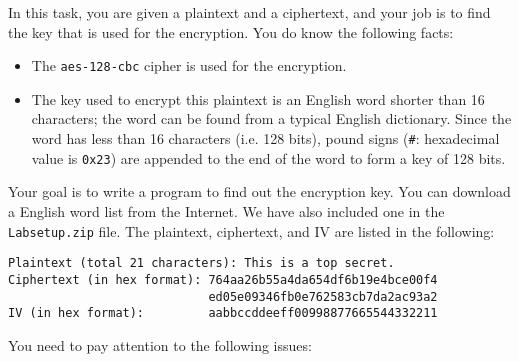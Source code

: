 In this task, you are given a plaintext and a ciphertext, and
your job is to find the key that is used for the encryption.
You do know the following facts:

\begin{itemize}
\item The {\tt aes-128-cbc} cipher is used for the encryption.
\item The key used to encrypt this plaintext is an English
word shorter than 16 characters; the word can be found from a typical
English dictionary.  Since the word has less than 16 characters (i.e. 128
bits), pound signs (\texttt{\#}: hexadecimal value is \texttt{0x23})
are appended to the end of the word to form a key of 128 bits.
\end{itemize}


Your goal is to write a program to
find out the encryption key. You can download a English word list
from the Internet.  We have also included one in
the \texttt{Labsetup.zip} file.
The plaintext, ciphertext, and IV are listed in the following:


\begin{lstlisting}
Plaintext (total 21 characters): This is a top secret.
Ciphertext (in hex format): 764aa26b55a4da654df6b19e4bce00f4
                            ed05e09346fb0e762583cb7da2ac93a2
IV (in hex format):         aabbccddeeff00998877665544332211
\end{lstlisting}



You need to pay attention to the following issues:

